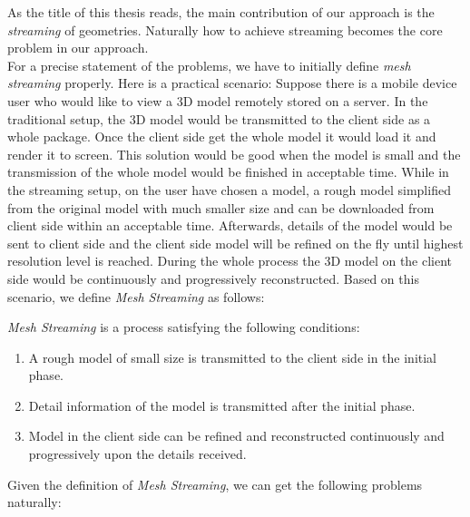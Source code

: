 As the title of this thesis reads, the main contribution of our approach is the \emph{streaming} of geometries. Naturally how to achieve streaming becomes the core problem in our approach. \\
For a precise statement of the problems, we have to initially define \emph{mesh streaming} properly. Here is a practical scenario: Suppose there is a mobile device user who would like to view a 3D model remotely stored on a server. In the traditional setup, the 3D model would be transmitted to the client side as a whole package. Once the client side get the whole model it would load it and render it to screen. This solution would be good when the model is small and the transmission of the whole model would be finished in acceptable time. While in the streaming setup, on the user have chosen a model, a rough model simplified from the original model with much smaller size and can be downloaded from client side within an acceptable time. Afterwards, details of the model would be sent to client side and the client side model will be refined on the fly until highest resolution level is reached. During the whole process the 3D model on the client side would be continuously and progressively reconstructed. Based on this scenario, we define \emph{Mesh Streaming} as follows: 
\begin{defn}
\emph{Mesh Streaming} is a process satisfying the following conditions: 
	\begin{enumerate}[label=\roman*]
		\item A rough model of small size is transmitted to the client side in the initial phase.
	  	\item Detail information of the model is transmitted after the initial phase. 
	  	\item Model in the client side can be refined and reconstructed continuously and progressively upon the details received. 
	\end{enumerate}
\end{defn}
Given the definition of \emph{Mesh Streaming}, we can get the following problems naturally: 

